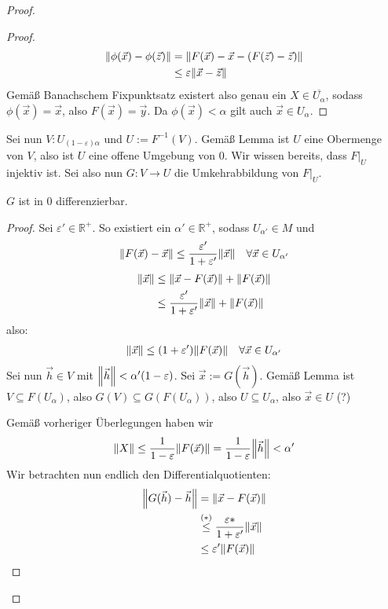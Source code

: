 \documentclass{report}
\renewcommand\epsilon{\varepsilon}
\newcommand*{\newpar}{\par\vspace{\baselineskip}\noindent}
\newcommand{\bR}{\mathbb{R}}
\newcommand{\vh}{\vec{h}}
\newcommand{\vx}{\vec{x}}
\newcommand{\vy}{\vec{y}}
\newcommand{\zz}{\vec{z}}
\begin{document}
\begin{proof}
\begin{proof}
\begin{align*}
   \norm{\phi(\vx) - \phi(\zz)} &= \norm{F(\vx) - \vx - (F(\zz) - \zz)}\\
                                &\leq \epsilon \norm{\vx - \zz}
  \end{align*}
  Gemäß Banachschem Fixpunktsatz existert also genau ein $X \in \overline{U_\alpha}$, sodass $\phi(\vx) = \vx$, also $F(\vx) = \vy$. Da $\phi(\vx) < \alpha$ gilt auch $\vx \in U_\alpha$.
 \end{proof}
 Sei nun $V : U_{(1 - \epsilon) \alpha}$ und $U := F^{-1}(V)$. Gemäß Lemma ist $U$ eine Obermenge von $V$, also ist $U$ eine offene Umgebung von $0$. Wir wissen bereits, dass $F|_U$ injektiv ist. Sei also nun $G : V \to U$ die Umkehrabbildung von $F|_U$.
 \begin{lemma}
  $G$ ist in $0$ differenzierbar.
 \end{lemma}
 \begin{proof}
 Sei $\epsilon' \in \bR^+$. So existiert ein $\alpha' \in \bR^+$, sodass $U_{\alpha'} \in M$ und
 \begin{align*}
  \norm{F(\vx) - \vx} \leq \frac{\epsilon'}{1 + \epsilon'} \norm{\vx} \quad \forall \vx \in U_{\alpha'}
 \end{align*}
 \begin{align*}
  \norm{\vx} &\leq \norm{\vx - F(\vx)} + \norm{F(\vx)}\\
             &\leq \frac{\epsilon'}{1 + \epsilon'} \norm{\vx} + \norm{F(\vx)}
 \end{align*}
 also:
 \begin{align*}
  \norm{\vx} \leq (1 + \epsilon') \norm{F(\vx)} \quad \forall \vx \in U_{\alpha'}
 \end{align*}
 Sei nun $\vh \in V$ mit $\norm{\vh} < \alpha'(1 - \epsilon)$. Sei $\vx := G(\vh)$. Gemäß Lemma ist $V \subseteq F(U_\alpha)$, also $G(V) \subseteq G(F(U_\alpha))$, also $U \subseteq U_\alpha$, also $\vx \in U$ (?)
 \newpar
 Gemäß vorheriger Überlegungen haben wir
 \begin{align*}
  \norm{X} \leq \frac{1}{1 - \epsilon} \norm{F(\vx)} = \frac{1}{1 - \epsilon} \norm{\vh} < \alpha' 
 \end{align*}
 Wir betrachten nun endlich den Differentialquotienten:
 \begin{align*}
  \norm{G(\vh) - \vh} &= \norm{\vx - F(\vx)}\\
                      &\overset{(*)}{\leq} \frac{\epsilon*}{1 + \epsilon'}\norm{\vx}\\
                      &\leq \epsilon'\norm{F(\vx)}\\

\end{align*}
\end{proof}
\end{proof}
\end{document}
